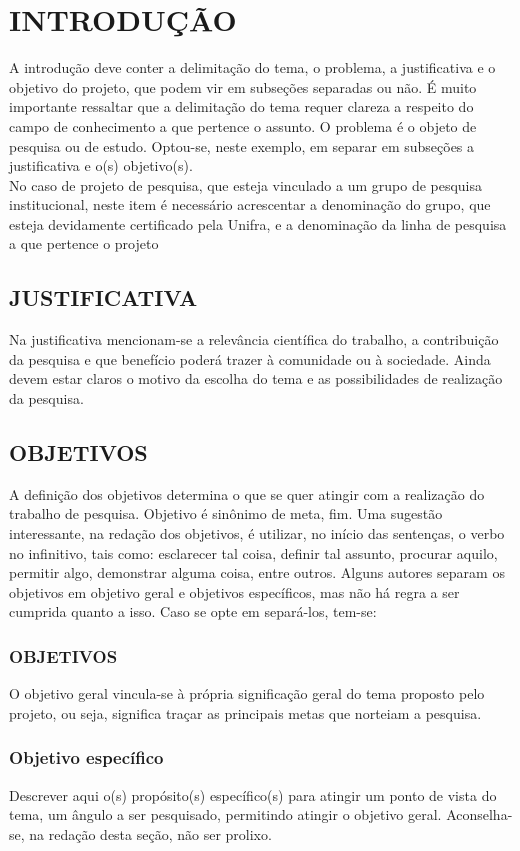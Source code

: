 \chapter{INTRODUÇÃO}
\label{chap:introducao}

A introdução deve conter a delimitação do tema, o problema, a justificativa e o
objetivo do projeto, que podem vir em subseções separadas ou não.
É muito importante ressaltar que a delimitação do tema requer clareza a respeito do
campo de conhecimento a que pertence o assunto. O problema é o objeto de pesquisa ou de
estudo. Optou-se, neste exemplo, em separar em subseções a justificativa e o(s) objetivo(s).\\
No caso de projeto de pesquisa, que esteja vinculado a um grupo de pesquisa
institucional, neste item é necessário acrescentar a denominação do grupo, que esteja
devidamente certificado pela Unifra, e a denominação da linha de pesquisa a que pertence o
projeto

\section{JUSTIFICATIVA}
\label{sec:justificativa}
Na justificativa mencionam-se a relevância científica do trabalho, a contribuição da
pesquisa e que benefício poderá trazer à comunidade ou à sociedade. Ainda devem estar claros
o motivo da escolha do tema e as possibilidades de realização da pesquisa.
\section{OBJETIVOS}
\label{sec:objetivos}
A definição dos objetivos determina o que se quer atingir com a realização do
trabalho de pesquisa. Objetivo é sinônimo de meta, fim.
Uma sugestão interessante, na redação dos objetivos, é utilizar, no início das
sentenças, o verbo no infinitivo, tais como: esclarecer tal coisa, definir tal assunto, procurar
aquilo, permitir algo, demonstrar alguma coisa, entre outros.
Alguns autores separam os objetivos em objetivo geral e objetivos específicos, mas
não há regra a ser cumprida quanto a isso. Caso se opte em separá-los, tem-se:
\subsection{OBJETIVOS}
\label{subsec:objetivogeral}
O objetivo geral vincula-se à própria significação geral do tema proposto pelo
projeto, ou seja, significa traçar as principais metas que norteiam a pesquisa.
\subsection{Objetivo específico}
\label{subsec:objetivoespecifico}
Descrever aqui o(s) propósito(s) específico(s) para atingir um ponto de vista do tema,
um ângulo a ser pesquisado, permitindo atingir o objetivo geral. Aconselha-se, na redação
desta seção, não ser prolixo.